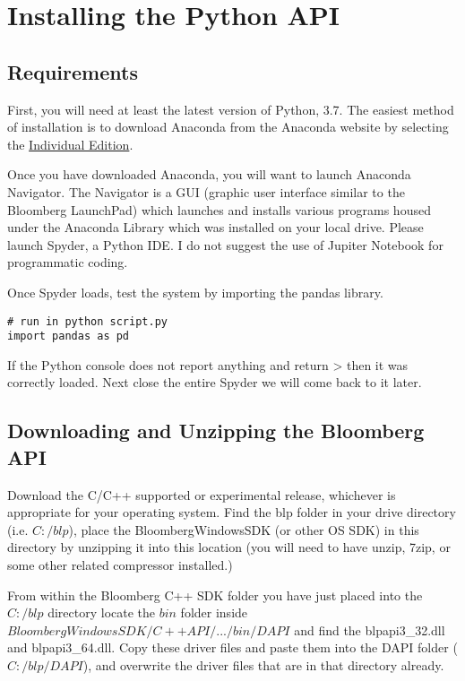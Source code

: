 \documentclass[]{book}
\begin{document}
\chapter{Installing the Python API}\label{installing-the-python-api}

\section{Requirements}\label{requirements}

First, you will need at least the latest version of Python, 3.7. The
easiest method of installation is to download Anaconda from the Anaconda
website by selecting the
\href{https://www.anaconda.com/products/individual}{Individual Edition}.

Once you have downloaded Anaconda, you will want to launch Anaconda
Navigator. The Navigator is a GUI (graphic user interface similar to the
Bloomberg LaunchPad) which launches and installs various programs housed
under the Anaconda Library which was installed on your local drive.
Please launch Spyder, a Python IDE. I do not suggest the use of Jupiter
Notebook for programmatic coding.

Once Spyder loads, test the system by importing the pandas library.

\begin{verbatim}
# run in python script.py
import pandas as pd 
\end{verbatim}

If the Python console does not report anything and return \textgreater{}
then it was correctly loaded. Next close the entire Spyder we will come
back to it later.

\section{Downloading and Unzipping the Bloomberg
API}\label{downloading-and-unzipping-the-bloomberg-api}

Download the C/C++ supported or experimental release, whichever is
appropriate for your operating system. Find the blp folder in your drive
directory (i.e. \(C:/ blp\)), place the BloombergWindowsSDK (or other OS
SDK) in this directory by unzipping it into this location (you will need
to have unzip, 7zip, or some other related compressor installed.)

From within the Bloomberg C++ SDK folder you have just placed into the
\(C:/blp\) directory locate the \(bin\) folder inside
\(BloombergWindowsSDK/C++API/.../bin/DAPI\) and find the blpapi3\_32.dll
and blpapi3\_64.dll. Copy these driver files and paste them into the
DAPI folder (\(C:/ blp/DAPI\)), and overwrite the driver files that are
in that directory already.
\end{document}
